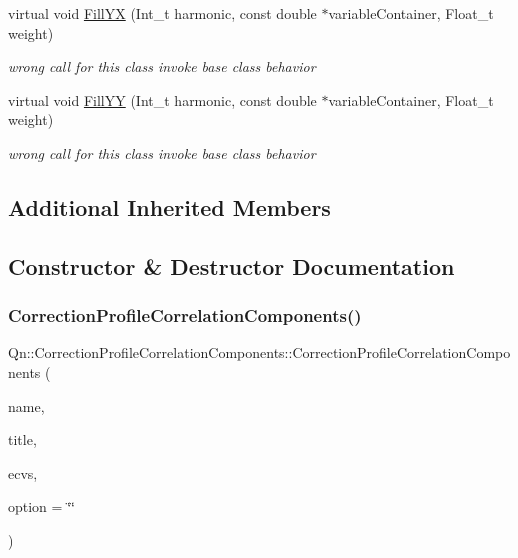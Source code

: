 \begin{DoxyCompactItemize}
virtual void \mbox{\hyperlink{classQn_1_1CorrectionProfileCorrelationComponents_a0404a6067482047e3be1a92dbf475cd6}{Fill\+YX}} (Int\+\_\+t harmonic, const double $\ast$variable\+Container, Float\+\_\+t weight)
\begin{DoxyCompactList}\small\item\em wrong call for this class invoke base class behavior \end{DoxyCompactList}\item 
\mbox{\label{classQn_1_1CorrectionProfileCorrelationComponents_a9897eecbae360761526ed3f99919df47}} 
virtual void \mbox{\hyperlink{classQn_1_1CorrectionProfileCorrelationComponents_a9897eecbae360761526ed3f99919df47}{Fill\+YY}} (Int\+\_\+t harmonic, const double $\ast$variable\+Container, Float\+\_\+t weight)
\begin{DoxyCompactList}\small\item\em wrong call for this class invoke base class behavior \end{DoxyCompactList}\end{DoxyCompactItemize}
\subsection*{Additional Inherited Members}


\subsection{Constructor \& Destructor Documentation}
\mbox{\label{classQn_1_1CorrectionProfileCorrelationComponents_aae547ab6d47a7008904a05045fbcd4bf}} 
\subsubsection{\texorpdfstring{Correction\+Profile\+Correlation\+Components()}{CorrectionProfileCorrelationComponents()}}
{\footnotesize\ttfamily Qn\+::\+Correction\+Profile\+Correlation\+Components\+::\+Correction\+Profile\+Correlation\+Components (\begin{DoxyParamCaption}\item[{const char $\ast$}]{name,  }\item[{const char $\ast$}]{title,  }\item[{\mbox{\hyperlink{classQn_1_1EventClassVariablesSet}{Event\+Class\+Variables\+Set}} \&}]{ecvs,  }\item[{Option\+\_\+t $\ast$}]{option = {\ttfamily \char`\"{}\char`\"{}} }\end{DoxyParamCaption})}

